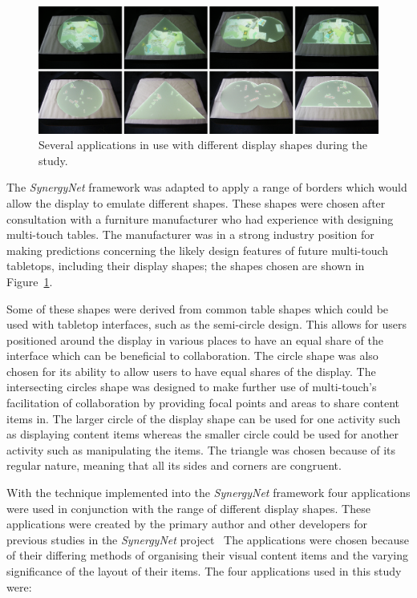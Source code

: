 \documentclass[review,5p,times,twocolumn]{elsarticle}
\begin{document}
\begin{figure}[t!] 
	\centerline{\includegraphics[width=1\textwidth]{figures/study.png}}
	\caption{Several applications in use with different display shapes during the study.}
	\label{fig:study}
\end{figure}

The {\emph{SynergyNet}} framework was adapted to apply a range of borders which would allow the display to emulate different shapes.
These shapes were chosen after consultation with a furniture manufacturer who had experience with designing multi-touch tables.
The manufacturer was in a strong industry position for making
predictions concerning the likely design features of future multi-touch tabletops, including their display shapes; the shapes chosen are shown in Figure~\ref{fig:study}.

Some of these shapes were derived from common table shapes which could be used with tabletop interfaces, such as the semi-circle design.
This allows for users positioned around the display in various places to have an equal share of the interface which can be beneficial to collaboration.
The circle shape was also chosen for its ability to allow users to have equal shares of the display.
The intersecting circles shape was designed to make further use of multi-touch's facilitation of collaboration by providing focal points and areas to share content items in.
The larger circle of the display shape can be used for one activity such as displaying content items whereas the smaller circle could be used for another activity such as manipulating the items.
The triangle was chosen because of its regular nature, meaning that all its sides and corners are congruent.

With the technique implemented into the {\emph{SynergyNet}} framework four applications were used in conjunction with the range of different display shapes.
These applications were created by the primary author and other developers for previous studies in the {\emph{SynergyNet}} project~\cite{higgins2011}
The applications were chosen because of their differing methods of organising their visual content items and the varying significance of the layout of their items.
The four applications used in this study were:
\end{document}

